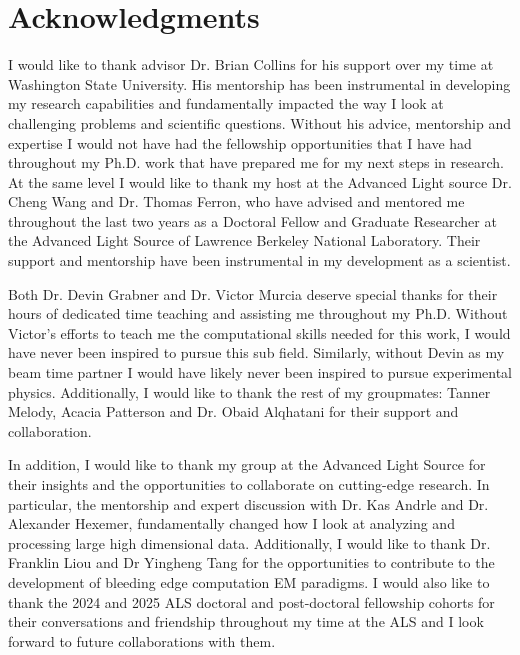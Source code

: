 \chapter*{Acknowledgments}

I would like to thank advisor Dr. Brian Collins for his support over my time at Washington State University. His mentorship has been instrumental in developing my research capabilities and fundamentally impacted the way I look at challenging problems and scientific questions. Without his advice, mentorship and expertise I would not have had the fellowship opportunities that I have had throughout my Ph.D. work that have prepared me for my next steps in research. At the same level I would like to thank my host at the Advanced Light source Dr. Cheng Wang and Dr. Thomas Ferron, who have advised and mentored me throughout the last two years as a Doctoral Fellow and Graduate Researcher at the Advanced Light Source of Lawrence Berkeley National Laboratory. Their support and mentorship have been instrumental in my development as a scientist.

Both Dr. Devin Grabner and Dr. Victor Murcia deserve special thanks for their hours of dedicated time teaching and assisting me throughout my Ph.D. Without Victor's efforts to teach me the computational skills needed for this work, I would have never been inspired to pursue this sub field. Similarly, without Devin as my beam time partner I would have likely never been inspired to pursue experimental physics. Additionally, I would like to thank the rest of my groupmates: Tanner Melody, Acacia Patterson and Dr. Obaid Alqhatani for their support and collaboration.

In addition, I would like to thank my group at the Advanced Light Source for their insights and the opportunities to collaborate on cutting-edge research. In particular, the mentorship and expert discussion with Dr. Kas Andrle and Dr. Alexander Hexemer, fundamentally changed how I look at analyzing and processing large high dimensional data. Additionally, I would like to thank Dr. Franklin Liou and Dr Yingheng Tang for the opportunities to contribute to the development of bleeding edge computation EM paradigms. I would also like to thank the 2024 and 2025 ALS doctoral and post-doctoral fellowship cohorts for their conversations and friendship throughout my time at the ALS and I look forward to future collaborations with them.


